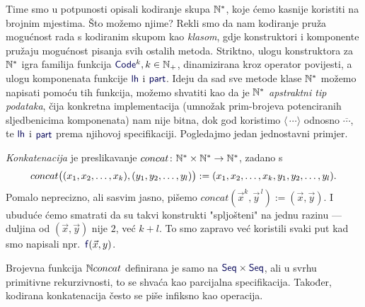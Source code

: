Time smo u potpunosti opisali kodiranje skupa ${\mathbb N}^*$, koje ćemo kasnije koristiti na brojnim mjestima. Što možemo njime? Rekli smo da nam kodiranje pruža mogućnost rada s kodiranim skupom kao \emph{klasom}, gdje konstruktori i komponente pružaju mo\-guć\-nost pisanja svih ostalih metoda. Striktno, ulogu konstruktora za ${\mathbb N}^*$ igra familija funkcija $\f{Code}^k,k\in\N_+$, dinamizirana kroz operator povijesti, a ulogu komponenata funkcije $\f{lh}$ i $\f{part}$. Ideju da sad sve metode klase ${\mathbb N}^*$ možemo napisati pomoću tih funkcija, možemo shvatiti kao da je ${\mathbb N}^*$ \emph{apstraktni tip podataka}, čija konkretna implementacija (umnožak prim-brojeva potenciranih sljedbenicima komponenata) nam nije bitna, dok god koristimo $\langle\,\cdots\rangle$ odnosno $\overline{\cdots}$, te $\f{lh}$ i $\f{part}$ prema njihovoj specifikaciji. Pogledajmo jedan jednostavni primjer.

\begin{primjer}\label{pr:concat}
\emph{Konkatenacija} je preslikavanje  $concat\colon{\mathbb N}^*\times{\mathbb N}^*\to{\mathbb N}^*$, zadano s
\begin{equation}
    concat\bigl((x_1,x_2,\dotsc,x_k),(y_1,y_2,\dotsc,y_l)\bigr):=(x_1,x_2,\dotsc,x_k,y_1,y_2,\dotsc,y_l)\text.
\end{equation}
Pomalo neprecizno, ali sasvim jasno, pišemo $concat(\vec x^k,\vec y^{\,l}):=(\vec x,\vec y)$. I ubuduće ćemo smatrati da su takvi konstrukti "spljošteni" na jednu razinu --- duljina od $(\vec x,\vec y)$ nije $2$, već $k+l$. To smo zapravo već koristili svaki put kad smo napisali npr.\ $\f{f}(\vec x,y)$.
\end{primjer}

Brojevna funkcija ${\mathbb N} concat$ definirana je samo na $\f{Seq}\times\f{Seq}$, ali u svrhu primitivne rekurzivnosti, to se shvaća kao parcijalna specifikacija. Također, kodirana konkatenacija često se piše infiksno kao operacija.

